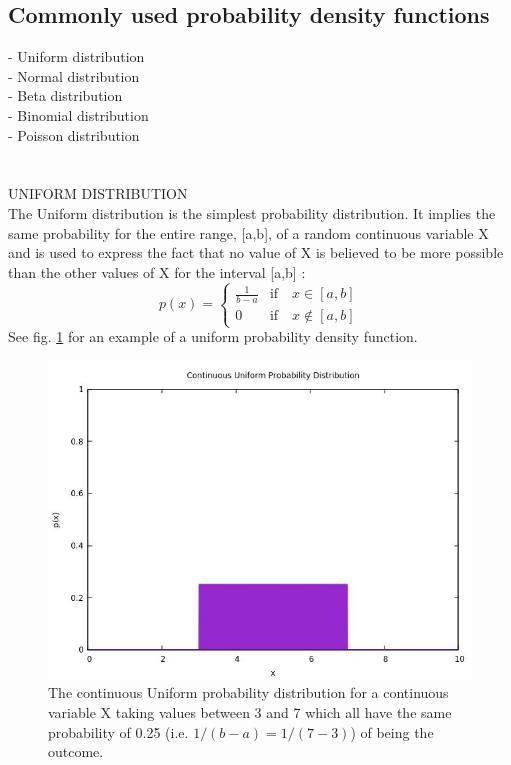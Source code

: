 \documentclass {article}
\begin{document}
\subsection {Commonly used probability density functions}

- Uniform distribution\\
- Normal distribution \\
- Beta distribution \\
- Binomial distribution \\
- Poisson distribution \\
\\
\\
UNIFORM DISTRIBUTION \\
The Uniform distribution is the simplest probability distribution. 
It implies the same probability for the entire range, [a,b], of a random continuous variable X and is used to express the fact that no value of X is believed to be more possible than the other values of X for the interval [a,b] \cite{jackman_bayesian_2009} \cite{lial_calculus_2012} \cite{pfeffer_practical_2016}:
\tab
\begin{equation}
 p(x)= 
\begin{cases}
\frac{1}{b-a} & \text{if} \quad x\in[a,b] \\
0 & \text{if} \quad x\notin [a,b]
\end{cases} 
\end{equation}
See fig. \ref{fig: unif distr} for an example of a uniform probability density function. 
\begin{figure} [H]
\includegraphics[width=\linewidth] {fig3.jpg}
\caption{The continuous Uniform probability distribution for a continuous variable X taking values between 3 and 7 which all have the same probability of 0.25 (i.e. $1/(b-a)=1/(7-3)$) of being the outcome.}
\label{fig: unif distr}
\end{figure}
\end{document}
